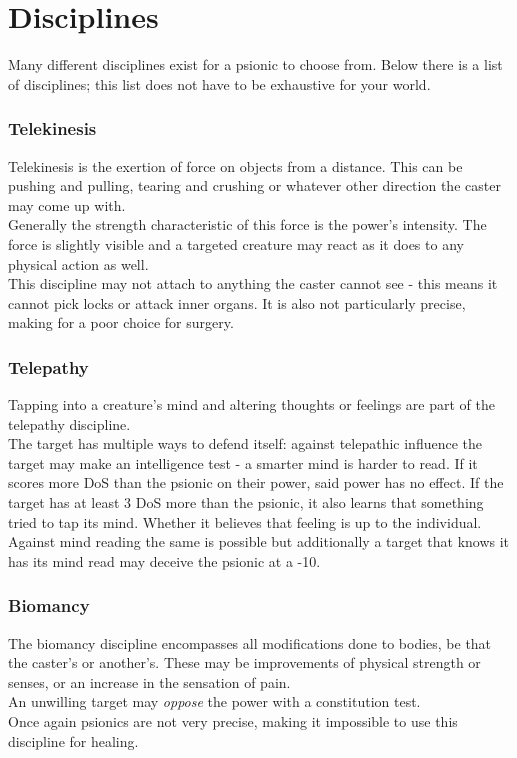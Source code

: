 \documentclass[12pt,a4paper,openany,usenames,dvipsnames]{book}
\begin{document}
	\section{Disciplines}
	Many different disciplines exist for a psionic to choose from. Below there is a list of disciplines; this list does not have to be exhaustive for your world.
	\subsubsection*{Telekinesis}
	Telekinesis is the exertion of force on objects from a distance. This can be pushing and pulling, tearing and crushing or whatever other direction the caster may come up with.\\
	Generally the strength characteristic of this force is the power's intensity. The force is slightly visible and a targeted creature may react as it does to any physical action as well.\\
	This discipline may not attach to anything the caster cannot see - this means it cannot pick locks or attack inner organs. It is also not particularly precise, making for a poor choice for surgery.
	\subsubsection*{Telepathy}
	Tapping into a creature's mind and altering thoughts or feelings are part of the telepathy discipline.\\
	The target has multiple ways to defend itself: against telepathic influence the target may make an intelligence test - a smarter mind is harder to read.
	If it scores more DoS than the psionic on their power, said power has no effect. If the target has at least 3 DoS more than the psionic, it also learns that something tried to tap its mind. Whether it believes that feeling is up to the individual.\\
	Against mind reading the same is possible but additionally a target that knows it has its mind read may deceive the psionic at a -10.
	\subsubsection*{Biomancy}
	The biomancy discipline encompasses all modifications done to bodies, be that the caster's or another's. These may be improvements of physical strength or senses, or an increase in the sensation of pain.\\
	An unwilling target may \emph{oppose} the power with a constitution test.\\
	Once again psionics are not very precise, making it impossible to use this discipline for healing.
\end{document}
